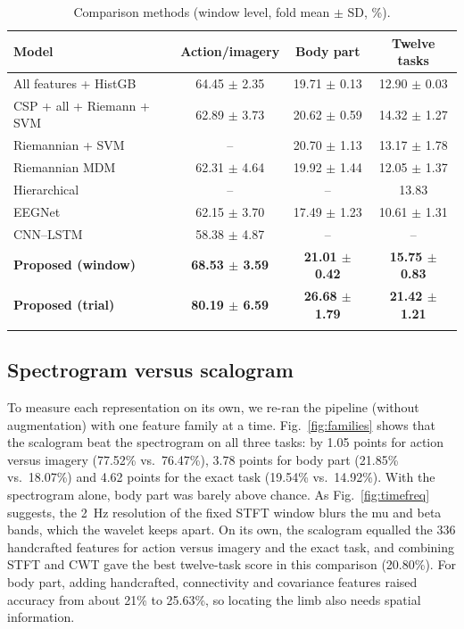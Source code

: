 \documentclass[pdflatex,sn-mathphys-num]{sn-jnl}%
\theoremstyle{thmstyleone}%
\theoremstyle{thmstyletwo}%
\theoremstyle{thmstylethree}%
\begin{document}
\begin{table}[!htbp]
\centering
\caption{Comparison methods (window level, fold mean $\pm$ SD, \%).}
\label{tab:baselines}
\footnotesize
\begin{tabular}{@{}lccc@{}}
\toprule
Model & Action/imagery & Body part & Twelve tasks \\
\midrule
All features + HistGB & 64.45 $\pm$ 2.35 & 19.71 $\pm$ 0.13 & 12.90 $\pm$ 0.03 \\
CSP + all + Riemann + SVM & 62.89 $\pm$ 3.73 & 20.62 $\pm$ 0.59 & 14.32 $\pm$ 1.27 \\
Riemannian + SVM & -- & 20.70 $\pm$ 1.13 & 13.17 $\pm$ 1.78 \\
Riemannian MDM & 62.31 $\pm$ 4.64 & 19.92 $\pm$ 1.44 & 12.05 $\pm$ 1.37 \\
Hierarchical & -- & -- & 13.83 \\
EEGNet & 62.15 $\pm$ 3.70 & 17.49 $\pm$ 1.23 & 10.61 $\pm$ 1.31 \\
CNN--LSTM & 58.38 $\pm$ 4.87 & -- & -- \\
\textbf{Proposed (window)} & \textbf{68.53 $\pm$ 3.59} & \textbf{21.01 $\pm$ 0.42} & \textbf{15.75 $\pm$ 0.83} \\
\textbf{Proposed (trial)} & \textbf{80.19 $\pm$ 6.59} & \textbf{26.68 $\pm$ 1.79} & \textbf{21.42 $\pm$ 1.21} \\
\botrule
\end{tabular}
\end{table}

\subsection{Spectrogram versus scalogram}
To measure each representation on its own, we re-ran the pipeline (without augmentation) with one feature family at a time. Fig.~\ref{fig:families} shows that the scalogram beat the spectrogram on all three tasks: by 1.05 points for action versus imagery (77.52\% vs.\ 76.47\%), 3.78 points for body part (21.85\% vs.\ 18.07\%) and 4.62 points for the exact task (19.54\% vs.\ 14.92\%). With the spectrogram alone, body part was barely above chance. As Fig.~\ref{fig:timefreq} suggests, the 2~Hz resolution of the fixed STFT window blurs the mu and beta bands, which the wavelet keeps apart. On its own, the scalogram equalled the 336 handcrafted features for action versus imagery and the exact task, and combining STFT and CWT gave the best twelve-task score in this comparison (20.80\%). For body part, adding handcrafted, connectivity and covariance features raised accuracy from about 21\% to 25.63\%, so locating the limb also needs spatial information.
\end{document}
